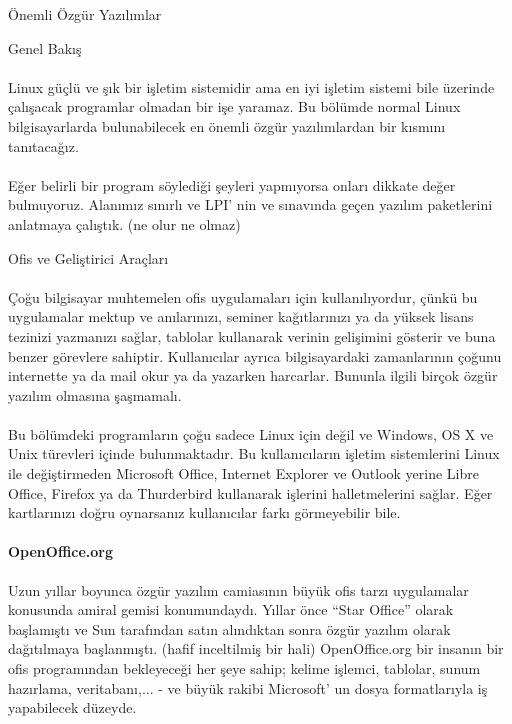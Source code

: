 \documentclass[10pt,a5paper]{book}
\begin{document}
\begin{section}{Önemli Özgür Yazılımlar}
\begin{subsection}{Genel Bakış}
\paragraph{}{Linux güçlü ve şık bir işletim sistemidir ama en iyi işletim sistemi bile üzerinde çalışacak programlar olmadan bir işe yaramaz. Bu bölümde normal Linux bilgisayarlarda bulunabilecek en önemli özgür yazılımlardan bir kısmını tanıtacağız.}
\paragraph{}{Eğer belirli bir program söylediği şeyleri yapmıyorsa onları dikkate değer bulmuyoruz. Alanımız sınırlı ve LPI' nin ve sınavında geçen yazılım paketlerini anlatmaya çalıştık. (ne olur ne olmaz)}
\end{subsection}
\begin{subsection}{Ofis ve Geliştirici Araçları}
\paragraph{}{Çoğu bilgisayar muhtemelen ofis uygulamaları için kullanılıyordur, çünkü bu uygulamalar mektup ve anılarınızı, seminer kağıtlarınızı ya da yüksek lisans tezinizi yazmanızı sağlar, tablolar kullanarak verinin gelişimini gösterir ve buna benzer görevlere sahiptir. Kullanıcılar ayrıca bilgisayardaki zamanlarının çoğunu internette ya da mail okur ya da yazarken harcarlar. Bununla ilgili birçok özgür yazılım olmasına şaşmamalı.}
\paragraph{}{Bu bölümdeki programların çoğu sadece Linux için değil ve Windows, OS X ve Unix türevleri içinde bulunmaktadır. Bu kullanıcıların işletim sistemlerini Linux ile değiştirmeden Microsoft Office, Internet Explorer ve Outlook yerine Libre Office, Firefox ya da Thurderbird kullanarak işlerini halletmelerini sağlar. Eğer kartlarınızı doğru oynarsanız kullanıcılar farkı görmeyebilir bile.}
\paragraph{OpenOffice.org}{Uzun yıllar boyunca özgür yazılım camiasının büyük ofis tarzı uygulamalar konusunda amiral gemisi konumundaydı. Yıllar önce “Star Office” olarak başlamıştı ve Sun tarafından satın alındıktan sonra özgür yazılım olarak dağıtılmaya başlanmıştı. (hafif inceltilmiş bir hali) OpenOffice.org bir insanın bir ofis programından bekleyeceği her şeye sahip; kelime işlemci, tablolar, sunum hazırlama, veritabanı,... - ve büyük rakibi Microsoft' un dosya formatlarıyla iş yapabilecek düzeyde.}

\end{subsection}
\end{section}
\end{document}
